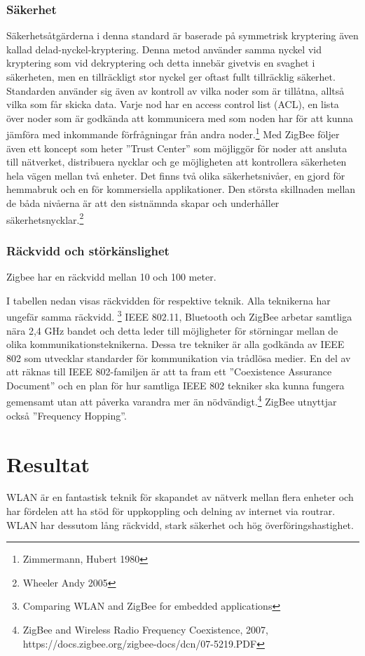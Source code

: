 \documentclass[a4paper,12pt,fleqn]{article}
\begin{document}
\subsubsection{Säkerhet}
Säkerhetsåtgärderna i denna standard är baserade på symmetrisk kryptering även kallad delad-nyckel-kryptering. Denna metod använder samma nyckel vid kryptering som vid dekryptering och detta innebär givetvis en svaghet i säkerheten, men en tillräckligt stor nyckel ger oftast fullt tillräcklig säkerhet. 
Standarden använder sig även av kontroll av vilka noder som är tillåtna, alltså vilka som får skicka data. Varje nod har en access control list (ACL), en lista över noder som är godkända att kommunicera med som noden har för att kunna jämföra med inkommande förfrågningar från andra noder.\footnote{Zimmermann, Hubert 1980} 
Med ZigBee följer även ett koncept som heter ''Trust Center'' som möjliggör för noder att ansluta till nätverket, distribuera nycklar och ge möjligheten att kontrollera säkerheten hela vägen mellan två enheter. Det finns två olika säkerhetsnivåer, en gjord för hemmabruk och en för kommersiella applikationer. Den största skillnaden mellan de båda nivåerna är att den sistnämnda skapar och underhåller säkerhetsnycklar.\footnote{Wheeler Andy 2005}
\subsubsection{Räckvidd och störkänslighet}
Zigbee har en räckvidd mellan 10 och 100 meter.

I tabellen nedan visas räckvidden för respektive teknik. Alla teknikerna har ungefär samma räckvidd. \footnote{Comparing WLAN and ZigBee for embedded applications}
IEEE 802.11, Bluetooth och ZigBee arbetar samtliga nära 2,4 GHz bandet och detta leder till möjligheter för störningar mellan de olika kommunikationsteknikerna. Dessa tre tekniker är alla godkända av IEEE 802 som utvecklar standarder för kommunikation via trådlösa medier. En del av att räknas till IEEE 802-familjen är att ta fram ett ''Coexistence Assurance Document'' och en plan för hur samtliga IEEE 802 tekniker ska kunna fungera gemensamt utan att påverka varandra mer än nödvändigt.\footnote{ZigBee and Wireless Radio Frequency Coexistence, 2007, https://docs.zigbee.org/zigbee-docs/dcn/07-5219.PDF}
ZigBee utnyttjar också ''Frequency Hopping''. 


\newpage

\section{Resultat}
WLAN är en fantastisk teknik för skapandet av nätverk mellan flera enheter och har fördelen att ha stöd för uppkoppling och delning av internet via routrar. WLAN har dessutom lång räckvidd, stark säkerhet och hög överföringshastighet.
  
\end{document}
